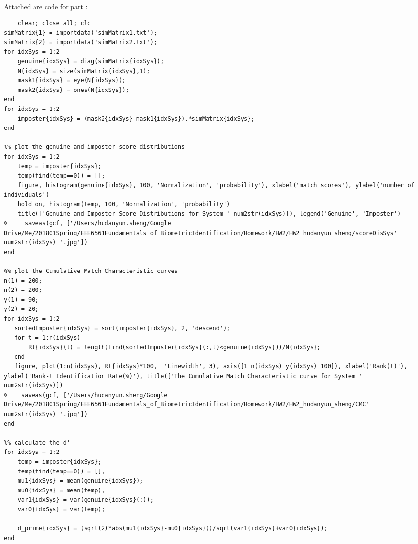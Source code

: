 \documentclass[a4paper]{article}
\begin{document}
\begin{spacing}{2.0}
	\newpage
	\large{Attached are code for part \uppercase\expandafter{} :}
	\normalsize
	\begin{lstlisting}
	clear; close all; clc
simMatrix{1} = importdata('simMatrix1.txt');
simMatrix{2} = importdata('simMatrix2.txt');
for idxSys = 1:2
    genuine{idxSys} = diag(simMatrix{idxSys});
    N{idxSys} = size(simMatrix{idxSys},1);
    mask1{idxSys} = eye(N{idxSys});
    mask2{idxSys} = ones(N{idxSys});
end
for idxSys = 1:2
    imposter{idxSys} = (mask2{idxSys}-mask1{idxSys}).*simMatrix{idxSys};
end

%% plot the genuine and imposter score distributions
for idxSys = 1:2
    temp = imposter{idxSys};
    temp(find(temp==0)) = [];
    figure, histogram(genuine{idxSys}, 100, 'Normalization', 'probability'), xlabel('match scores'), ylabel('number of individuals')
    hold on, histogram(temp, 100, 'Normalization', 'probability')
    title(['Genuine and Imposter Score Distributions for System ' num2str(idxSys)]), legend('Genuine', 'Imposter')
%     saveas(gcf, ['/Users/hudanyun.sheng/Google Drive/Me/201801Spring/EEE6561Fundamentals_of_BiometricIdentification/Homework/HW2/HW2_hudanyun_sheng/scoreDisSys' num2str(idxSys) '.jpg'])
end

%% plot the Cumulative Match Characteristic curves
n(1) = 200;
n(2) = 200;
y(1) = 90;
y(2) = 20;
for idxSys = 1:2
   sortedImposter{idxSys} = sort(imposter{idxSys}, 2, 'descend');
   for t = 1:n(idxSys)
       Rt{idxSys}(t) = length(find(sortedImposter{idxSys}(:,t)<genuine{idxSys}))/N{idxSys};
   end
   figure, plot(1:n(idxSys), Rt{idxSys}*100,  'Linewidth', 3), axis([1 n(idxSys) y(idxSys) 100]), xlabel('Rank(t)'), ylabel('Rank-t Identification Rate(%)'), title(['The Cumulative Match Characteristic curve for System ' num2str(idxSys)])
%    saveas(gcf, ['/Users/hudanyun.sheng/Google Drive/Me/201801Spring/EEE6561Fundamentals_of_BiometricIdentification/Homework/HW2/HW2_hudanyun_sheng/CMC' num2str(idxSys) '.jpg'])
end

%% calculate the d'
for idxSys = 1:2
	temp = imposter{idxSys};
    temp(find(temp==0)) = [];
    mu1{idxSys} = mean(genuine{idxSys});
    mu0{idxSys} = mean(temp);
    var1{idxSys} = var(genuine{idxSys}(:));
    var0{idxSys} = var(temp);
    
    d_prime{idxSys} = (sqrt(2)*abs(mu1{idxSys}-mu0{idxSys}))/sqrt(var1{idxSys}+var0{idxSys});
end



\end{lstlisting}
\end{spacing}
\end{document}
